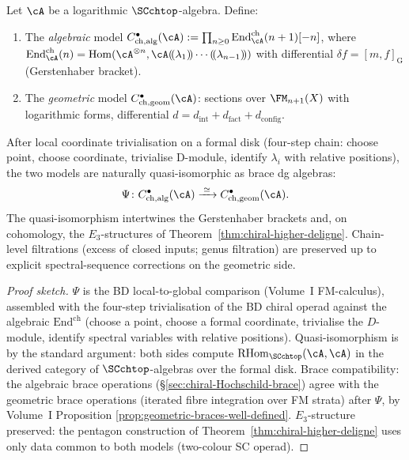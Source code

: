\begin{proposition}%
\label{thm:chiral-hochschild-models-equivalent}%
%
%
%
Let $\cA$ be a logarithmic $\SCchtop$-algebra. Define:
\begin{enumerate}
 \item[\textup{(a)}] The \emph{algebraic} model
 $C^\bullet_{\mathrm{ch,alg}}(\cA)
 :=\prod_{n\ge 0}\mathrm{End}^{\mathrm{ch}}_\cA(n+1)[-n]$,
 where $\mathrm{End}^{\mathrm{ch}}_\cA(n)=
 \mathrm{Hom}(\cA^{\otimes n},\cA(\!(\lambda_1)\!)\cdots(\!(\lambda_{n-1})\!))$
 with differential $\delta f=[m,f]_{\mathrm{G}}$ (Gerstenhaber bracket).
 \item[\textup{(b)}] The \emph{geometric} model
 $C^\bullet_{\mathrm{ch,geom}}(\cA)$: sections over $\FM_{n+1}(X)$
 with logarithmic forms, differential $d=d_{\mathrm{int}}+d_{\mathrm{fact}}+d_{\mathrm{config}}$.
\end{enumerate}
After local coordinate trivialisation on a formal disk (four-step
chain: choose point, choose coordinate, trivialise D-module,
identify $\lambda_i$ with relative positions), the two models are
naturally quasi-isomorphic as brace dg algebras:
\[
\Psi\colon C^\bullet_{\mathrm{ch,alg}}(\cA)
\xrightarrow{\;\simeq\;} C^\bullet_{\mathrm{ch,geom}}(\cA).
\]
The quasi-isomorphism intertwines the Gerstenhaber brackets
and, on cohomology, the $E_3$-structures of
Theorem~\ref{thm:chiral-higher-deligne}.
Chain-level filtrations (excess of closed inputs; genus filtration)
are preserved up to explicit spectral-sequence corrections
on the geometric side.
\end{proposition}

\begin{proof}[Proof sketch]
$\Psi$ is the BD local-to-global comparison (Volume~I
FM-calculus), assembled with the four-step trivialisation of the
BD chiral operad against the algebraic $\mathrm{End}^{\mathrm{ch}}$
(choose a point, choose a formal coordinate, trivialise the
$D$-module, identify spectral variables with relative positions).
Quasi-isomorphism is by the standard argument: both sides compute
$\mathrm{RHom}_{\SCchtop}(\cA,\cA)$ in the derived category of
$\SCchtop$-algebras over the formal disk.
Brace compatibility: the algebraic brace operations
(\S\ref{sec:chiral-Hochschild-brace}) agree with the geometric brace
operations (iterated fibre integration over FM strata) after
$\Psi$, by Volume~I Proposition
\ref*{prop:geometric-braces-well-defined}.
$E_3$-structure preserved: the pentagon construction of
Theorem~\ref{thm:chiral-higher-deligne} uses only data common to both
models (two-colour SC operad).
\end{proof}

